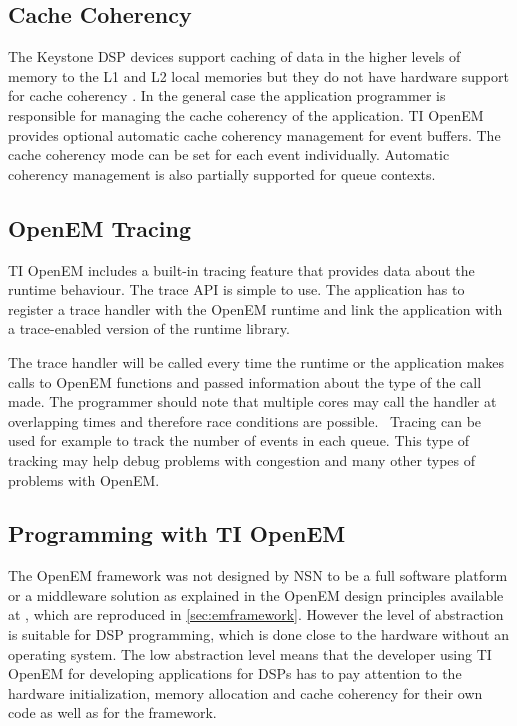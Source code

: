 \subsection{Cache Coherency}
\label{subsec:ti-cache-coherency}
The Keystone DSP devices support caching of data in the higher levels of memory to the L1 and L2 local memories but they do not have hardware support for cache coherency \cite{openemapi}. In the general case the application programmer is responsible for managing the cache coherency of the application. TI OpenEM provides optional automatic cache coherency management for event buffers. The cache coherency mode can be set for each event individually. Automatic coherency management is also partially supported for queue contexts.~\cite{moerman2014open}

\subsection{OpenEM Tracing}
\label{subsec:ti-tracing}
TI OpenEM includes a built-in tracing feature that provides data about the runtime behaviour. The trace API is simple to use. The application has to register a trace handler with the OpenEM runtime and link the application with a trace-enabled version of the runtime library.~\cite{openemapi}

The trace handler will be called every time the runtime or the application makes calls to OpenEM functions and passed information about the type of the call made. The programmer should note that multiple cores may call the handler at overlapping times and therefore race conditions are possible.~\cite{openemapi} Tracing can be used for example to track the number of events in each queue. This type of tracking may help debug problems with congestion and many other types of problems with OpenEM.

\subsection{Programming with TI OpenEM}
\label{subsec:ti-init-layer}
The OpenEM framework was not designed by NSN to be a full software platform or a middleware solution as explained in the OpenEM design principles available at \cite{openempage}, which are reproduced in \ref{sec:emframework}. However the level of abstraction is suitable for DSP programming, which is done close to the hardware without an operating system. The low abstraction level means that the developer using TI OpenEM for developing applications for DSPs has to pay attention to the hardware initialization, memory allocation and cache coherency for their own code as well as for the framework.~\cite{openemuser}

